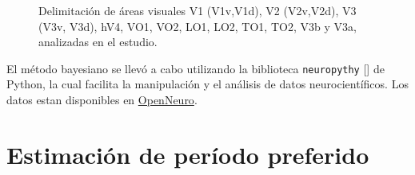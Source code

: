 \begin{figure}[h]
	\centering
	\hfill
	\caption{Delimitaci\'on de \'areas visuales V1 (V1v,V1d), V2 (V2v,V2d), V3 (V3v, V3d), hV4, VO1, VO2, LO1, LO2, TO1, TO2, V3b y V3a, analizadas en el estudio.}
	\label{fig:brain}
\end{figure}

El método bayesiano se llevó a cabo utilizando la biblioteca \texttt{neuropythy} [\cite{benson_human_2018}] de Python, la cual facilita la manipulación y el análisis de datos neurocientíficos. Los datos estan disponibles en \href{https://openneuro.org/datasets/ds003812/versions/1.1.0}{OpenNeuro}.


\section{Estimaci\'on de per\'iodo preferido}

